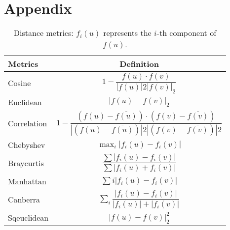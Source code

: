 \chapter*{Appendix}

    \begin{table}[h]
        \centering
        \footnotesize
        \begin{tabular}{l|c}
        \toprule
        Metrics & Definition \\
        \midrule
        Cosine & $1 - \dfrac{f(u)\cdot f(v)}{\left|f(u)\right|2\left|f(v)\right|_2}$ \\
        Euclidean & $\left|f(u) - f(v)\right|_2$ \\
        Correlation & $1-\dfrac{(f(u)-\overline{f(u)}) \cdot(f(v)-\overline{f(v)})}{|(f(u)-\overline{f(u)})|{2}|(f(v)-\overline{f(v)})|{2}}$ \\
        Chebyshev & $\max _{i}\left|f_i(u)-f_i(v)\right|$ \\
        Braycurtis & $\dfrac{\sum\left|f_i(u)-f_i(v)\right|} {\sum\left|f_i(u)+f_i(v)\right|}$ \\
        Manhattan & $\sum{i}\left|f_i(u)-f_i(v)\right|$ \\
        Canberra & $\sum_{i} \dfrac{\left|f_i(u)-f_i(v)\right|}{\left|f_i(u)\right|+\left|f_i(v)\right|}$ \\
        Sqeuclidean & $\left|f(u) - f(v)\right|_2^2$ \\
        \bottomrule
        \end{tabular}
        \caption{Distance metrics: $f_i(u)$ represents the $i$-th component of $f(u)$.}
        \label{table:distance}
    \end{table}

